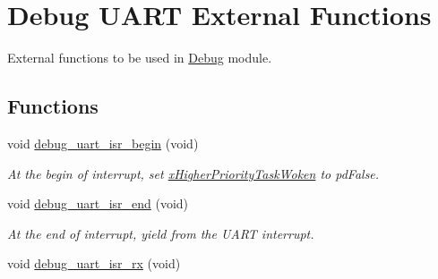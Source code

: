 \hypertarget{group___debug___u_a_r_t___external___functions}{}\section{Debug U\+A\+RT External Functions}
\label{group___debug___u_a_r_t___external___functions}


External functions to be used in \hyperlink{group___debug}{Debug} module.  


\subsection*{Functions}
\begin{DoxyCompactItemize}
\item 
void \hyperlink{group___debug___u_a_r_t___external___functions_ga9d19c0e57b2d37c01bd781338322f682}{debug\+\_\+uart\+\_\+isr\+\_\+begin} (void)\hypertarget{group___debug___u_a_r_t___external___functions_ga9d19c0e57b2d37c01bd781338322f682}{}\label{group___debug___u_a_r_t___external___functions_ga9d19c0e57b2d37c01bd781338322f682}

\begin{DoxyCompactList}\small\item\em At the begin of interrupt, set \hyperlink{group___debug___private___variables_ga9d9a749ad99ec3d4a6886d5277b9ba87}{x\+Higher\+Priority\+Task\+Woken} to pd\+False. \end{DoxyCompactList}\item 
void \hyperlink{group___debug___u_a_r_t___external___functions_ga3f4c952ea2b6368ccbb0572addd76601}{debug\+\_\+uart\+\_\+isr\+\_\+end} (void)\hypertarget{group___debug___u_a_r_t___external___functions_ga3f4c952ea2b6368ccbb0572addd76601}{}\label{group___debug___u_a_r_t___external___functions_ga3f4c952ea2b6368ccbb0572addd76601}

\begin{DoxyCompactList}\small\item\em At the end of interrupt, yield from the U\+A\+RT interrupt. \end{DoxyCompactList}\item 
void \hyperlink{group___debug___u_a_r_t___external___functions_ga2e1878be0250daf30f0a286af6e683e9}{debug\+\_\+uart\+\_\+isr\+\_\+rx} (void)\hypertarget{group___debug___u_a_r_t___external___functions_ga2e1878be0250daf30f0a286af6e683e9}{}\label{group___debug___u_a_r_t___external___functions_ga2e1878be0250daf30f0a286af6e683e9}


\end{DoxyCompactItemize}

